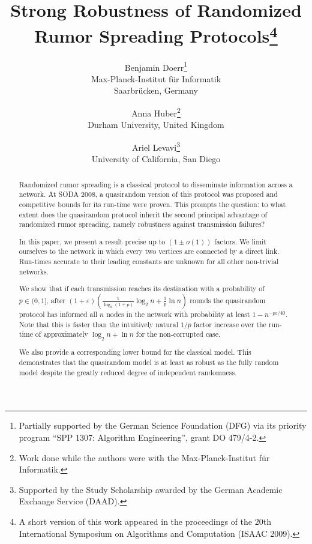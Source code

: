 \documentclass[12pt]{article}
\newcommand{\e}{\varepsilon}
\begin{document}
\title{Strong Robustness of Randomized\\ Rumor Spreading Protocols\thanks{A short version of this work appeared in the proceedings of the 20th International Symposium on Algorithms and Computation (ISAAC 2009).}}

\author{Benjamin Doerr\thanks{Partially supported by the German Science
Foundation (DFG) via its priority program ``SPP 1307: Algorithm Engineering'', grant DO 479/4-2.}\\
Max-Planck-Institut f\"ur Informatik\\
Saarbr\"ucken, Germany\\
\and Anna Huber\thanks{Work done while the authors were with the Max-Planck-Institut f\"ur Informatik.}\\
Durham University, United Kingdom\\
\and Ariel Levavi\samethanks\hspace{6pt}\thanks{Supported by the Study Scholarship awarded by the German Academic Exchange Service (DAAD).}\\
University of California, San Diego\\
}
\date{}

\maketitle

\begin{abstract}
  Randomized rumor spreading is a classical protocol to disseminate information across a network. At SODA 2008, a quasirandom version of this protocol was proposed and competitive bounds for its run-time were proven. This prompts the question: to what extent does the quasirandom protocol inherit the second principal advantage of randomized rumor spreading, namely robustness against transmission failures? 
  
In this paper, we present a result precise up to $(1 \pm o(1))$ factors. We limit ourselves to the network in which every two vertices are connected by a direct link.  Run-times accurate to their leading constants are unknown for all other non-trivial networks. 
  
  We show that if each transmission reaches its destination with a probability of $p \in (0,1]$, after $(1+\e)\left(\frac{1}{\log_2(1+p)}\log_2n+\frac{1}{p}\ln n\right)$ rounds the quasirandom protocol has informed all $n$ nodes in the network with probability at least $1-n^{-p\e/40}$. Note that this is faster than the intuitively natural $1/p$ factor increase over the run-time of approximately $\log_2 n  + \ln n $ for the non-corrupted case. 
  
  We also provide a corresponding lower bound for the classical model. This demonstrates that the quasirandom model is at least as robust as the fully random model despite the greatly reduced degree of independent randomness. 
\end{abstract}
\end{document}
